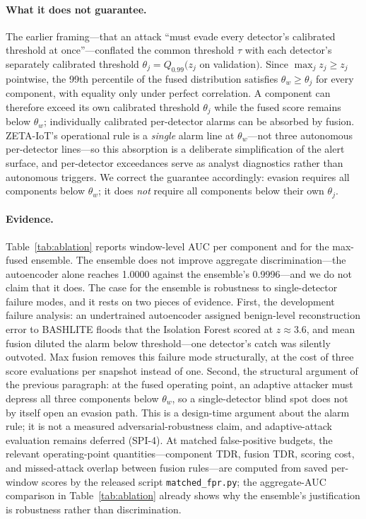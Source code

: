 \documentclass[sigconf,review,anonymous]{acmart}
\begin{document}
\paragraph{What it does not guarantee.} The earlier framing---that an attack ``must evade every detector's calibrated threshold at once''---conflated the common threshold $\tau$ with each detector's separately calibrated threshold $\theta_j = Q_{0.99}(z_j$ on validation$)$. Since $\max_j z_j \ge z_j$ pointwise, the 99th percentile of the fused distribution satisfies $\theta_w \ge \theta_j$ for every component, with equality only under perfect correlation. A component can therefore exceed its own calibrated threshold $\theta_j$ while the fused score remains below $\theta_w$; individually calibrated per-detector alarms can be absorbed by fusion. ZETA-IoT's operational rule is a \emph{single} alarm line at $\theta_w$---not three autonomous per-detector lines---so this absorption is a deliberate simplification of the alert surface, and per-detector exceedances serve as analyst diagnostics rather than autonomous triggers. We correct the guarantee accordingly: evasion requires all components below $\theta_w$; it does \emph{not} require all components below their own $\theta_j$.

\paragraph{Evidence.} Table~\ref{tab:ablation} reports window-level AUC per component and for the max-fused ensemble. The ensemble does not improve aggregate discrimination---the autoencoder alone reaches 1.0000 against the ensemble's 0.9996---and we do not claim that it does. The case for the ensemble is robustness to single-detector failure modes, and it rests on two pieces of evidence. First, the development failure analysis: an undertrained autoencoder assigned benign-level reconstruction error to BASHLITE floods that the Isolation Forest scored at $z \approx 3.6$, and mean fusion diluted the alarm below threshold---one detector's catch was silently outvoted. Max fusion removes this failure mode structurally, at the cost of three score evaluations per snapshot instead of one. Second, the structural argument of the previous paragraph: at the fused operating point, an adaptive attacker must depress all three components below $\theta_w$, so a single-detector blind spot does not by itself open an evasion path. This is a design-time argument about the alarm rule; it is not a measured adversarial-robustness claim, and adaptive-attack evaluation remains deferred (SPI-4). At matched false-positive budgets, the relevant operating-point quantities---component TDR, fusion TDR, scoring cost, and missed-attack overlap between fusion rules---are computed from saved per-window scores by the released script \texttt{matched\_fpr.py}; the aggregate-AUC comparison in Table~\ref{tab:ablation} already shows why the ensemble's justification is robustness rather than discrimination.
\end{document}
